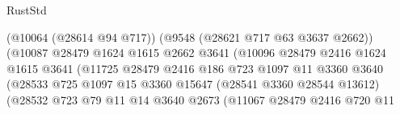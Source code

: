\begin{lexlean}{RustStd}
\begin{coremodule}
                                                (@10064 (@28614 @94 @717))
                                                (@9548 (@28621 @717 @63 @3637 @2662))
                                                (@10087
                                                  @28479
                                                  @1624
                                                  @1615
                                                  @2662
                                                  @3641
                                                  (@10096
                                                    @28479
                                                    @2416
                                                    @1624
                                                    @1615
                                                    @3641
                                                    (@11725
                                                      @28479
                                                      @2416
                                                      @186
                                                      @723
                                                      @1097
                                                      @11
                                                      @3360
                                                      @3640
                                                      (@28533
                                                        @725
                                                        @1097
                                                        @15
                                                        @3360
                                                        @15647
                                                        (@28541 @3360 @28544 @13612)
                                                        (@28532
                                                          @723
                                                          @79
                                                          @11
                                                          @14
                                                          @3640
                                                          @2673
                                                          (@11067
                                                            @28479
                                                            @2416
                                                            @720
                                                            @11

\end{coremodule}
\end{lexlean}
